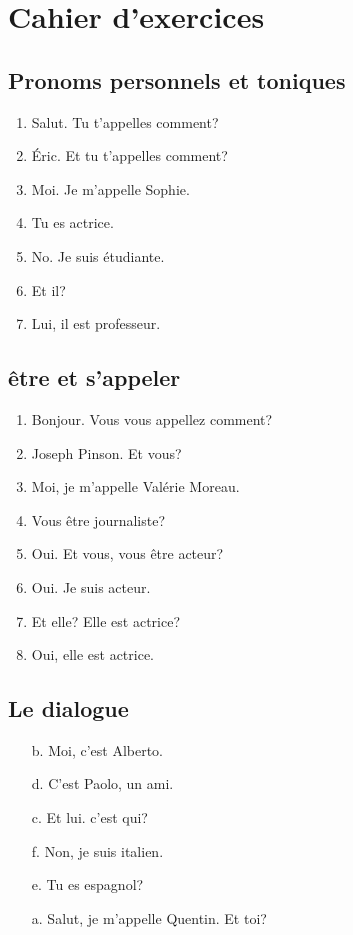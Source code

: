 \section{Cahier d'exercices}

\subsection{Pronoms personnels et toniques}
\begin{enumerate}
    \item Salut. Tu t'appelles comment?
    \item Éric. Et tu t'appelles comment?
    \item Moi. Je m'appelle Sophie.
    \item Tu es actrice.
    \item No. Je suis étudiante.
    \item Et il?
    \item Lui, il est professeur.
\end{enumerate}

\subsection{être et s'appeler}
\begin{enumerate}
    \item Bonjour. Vous vous appellez comment?
    \item Joseph Pinson. Et vous?
    \item Moi, je m'appelle Valérie Moreau.
    \item Vous être journaliste?
    \item Oui. Et vous, vous être acteur?
    \item Oui. Je suis acteur.
    \item Et elle? Elle est actrice?
    \item Oui, elle est actrice.
\end{enumerate}

\subsection{Le dialogue}
\begin{enumerate}[label=\alph*.]
    \item[b.] Moi, c'est Alberto.
    \item[d.] C'est Paolo, un ami.
    \item[c.] Et lui. c'est qui?
    \item[f.] Non, je suis italien.
    \item[e.] Tu es espagnol?
    \item[a.] Salut, je m'appelle Quentin. Et toi?
\end{enumerate}

